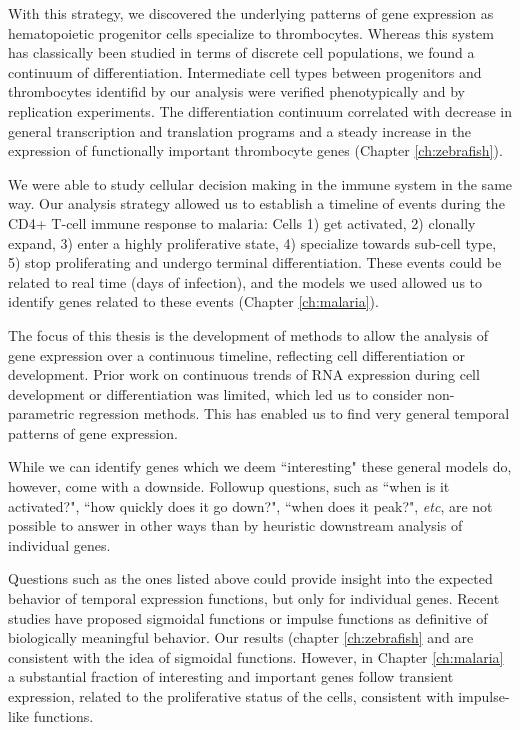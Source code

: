 With this strategy, we discovered the underlying patterns of gene expression as hematopoietic progenitor cells specialize to thrombocytes. Whereas this system has classically been studied in terms of discrete cell populations, we found a continuum of differentiation. Intermediate cell types between progenitors and thrombocytes identifid by our analysis were verified phenotypically and by replication experiments. The differentiation continuum correlated with decrease in general transcription and translation programs and a steady increase in the expression of functionally important thrombocyte genes (Chapter \ref{ch:zebrafish}).

We were able to study cellular decision making in the immune system in the same way. Our analysis strategy allowed us to establish a timeline of events during the CD4+ T-cell immune response to malaria: Cells 1) get activated, 2) clonally expand, 3) enter a highly proliferative state, 4) specialize towards sub-cell type, 5) stop proliferating and undergo terminal differentiation. These events could be related to real time (days of infection), and the models we used allowed us to identify genes related to these events (Chapter \ref{ch:malaria}).

The focus of this thesis is the development of methods to allow the analysis of gene expression over a continuous timeline, reflecting cell differentiation or development. Prior work on continuous trends of RNA expression during cell development or differentiation was limited, which led us to consider non-parametric regression methods. This has enabled us to find very general temporal patterns of gene expression.

While we can identify genes which we deem ``interesting" these general models do, however, come with a downside. Followup questions, such as ``when is it activated?", ``how quickly does it go down?", ``when does it peak?", \textit{etc}, are not possible to answer in other ways than by heuristic downstream analysis of individual genes.

Questions such as the ones listed above could provide insight into the expected behavior of temporal expression functions, but only for individual genes. Recent studies have proposed sigmoidal functions \cite{Campbell2016-bd} or impulse functions \cite{Sander2016-by} as definitive of biologically meaningful behavior. Our results  (chapter \ref{ch:zebrafish} and \citet{Eckersley-Maslin2016-cz} are consistent with the idea of sigmoidal functions. However, in Chapter \ref{ch:malaria} a substantial fraction of interesting and important genes follow transient expression, related to the proliferative status of the cells, consistent with impulse-like functions.

